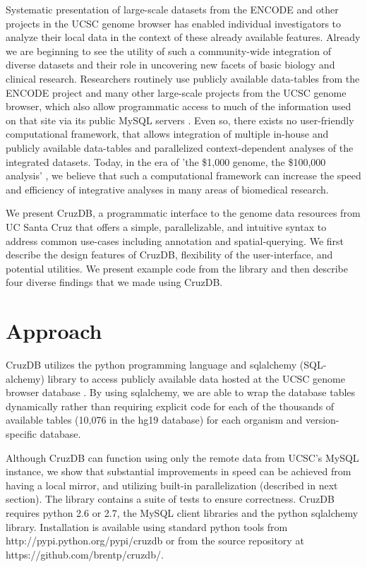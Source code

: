 \documentclass{bioinfo}
\begin{document}
Systematic presentation of large-scale datasets from the ENCODE \citep{ENCODE} and other projects in the UCSC genome browser \citep{KentBrowser} has enabled individual investigators to analyze their local data in the context of these already available features. Already we are beginning to see the utility of such a community-wide integration of diverse datasets and their role in uncovering new facets of basic biology and clinical research. Researchers routinely use publicly available data-tables from the ENCODE project and many other large-scale projects from the UCSC genome browser, which also allow programmatic access to much of the information used on that site via its public MySQL servers \citep{Dreszer}. Even so, there exists no user-friendly computational framework, that allows integration of multiple in-house and publicly available data-tables and parallelized context-dependent analyses of the integrated datasets. Today, in the era of 'the \$1,000 genome, the \$100,000 analysis' \citep{Mardis}, we believe that such a computational framework can increase the speed and efficiency of integrative analyses in many areas of biomedical research. 

We present CruzDB, a programmatic interface to the genome data resources from UC Santa Cruz \citep{Dreszer} that offers a simple, parallelizable, and intuitive syntax to address common use-cases including annotation and spatial-querying. 
We first describe the design features of CruzDB, flexibility of the user-interface, and potential utilities. 
We present example code from the library and then describe four diverse findings that we made using CruzDB.


\section{Approach}

CruzDB utilizes the python programming language and sqlalchemy (SQL-alchemy) library to access publicly available data hosted at the UCSC genome browser database\citep{Dreszer} . By using sqlalchemy, we are able to wrap the database tables dynamically rather than requiring explicit code for each of the thousands of available tables (10,076 in the hg19 database) for each organism and version-specific database. 

Although CruzDB can function using only the remote data from UCSC's MySQL instance, we show that  substantial improvements in speed can be achieved from having a local mirror, and utilizing built-in parallelization (described in next section). The library contains a suite of tests to ensure correctness. CruzDB requires python 2.6 or 2.7, the MySQL client libraries and the python sqlalchemy library. Installation is available using standard python tools from http://pypi.python.org/pypi/cruzdb or from the source repository at https://github.com/brentp/cruzdb/.
\end{document}
